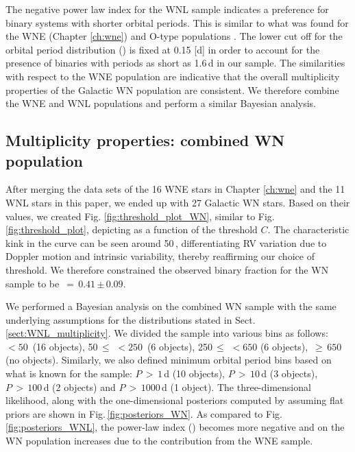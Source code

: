 The negative power law index for the WNL sample indicates a preference for binary systems with shorter orbital periods. This is similar to what was found for the WNE (Chapter \ref{ch:wne}) and O-type populations \citep{sana_binary_2012}. The lower cut off for the orbital period distribution (\logPminWNL{}) is fixed at 0.15 [d] in order to account for the presence of binaries with periods as short as 1.6\,d in our sample. The similarities with respect to the WNE population are indicative that the overall multiplicity properties of the Galactic WN population are consistent. We therefore combine the WNE and WNL populations and perform a similar Bayesian analysis.


\subsection{Multiplicity properties: combined WN population}  \label{sect:WN_multiplicity}
After merging the data sets of the 16 WNE stars in Chapter \ref{ch:wne} and the 11 WNL stars in this paper, we ended up with 27 Galactic WN stars. Based on their \DelRV{} values, we created Fig. \ref{fig:threshold_plot_WN}, similar to Fig. \ref{fig:threshold_plot}, depicting \fobsWN{} as a function of the threshold $C$. The characteristic kink in the curve can be seen around 50\,\kms{}, differentiating RV variation due to Doppler motion and intrinsic variability, thereby reaffirming our choice of threshold. We therefore constrained the observed binary fraction for the WN sample to be \fobsWN{}\,$=\,0.41$\,$\pm$\,$0.09$.

We performed a Bayesian analysis on the combined WN sample with the same underlying assumptions for the distributions stated in Sect. \ref{sect:WNL_multiplicity}. We divided the sample into various \DelRV{} bins as follows: \DelRV{}\,$< 50\,$\kms{} (16 objects), 50\,$\le$\,\DelRV{}\,$<250\,$\kms{} (6 objects), 250\,$\le$\,\DelRV{}\,$<650$ (6 objects), \DelRV{}\,$\ge\,650$\,\kms{} (no objects). Similarly, we also defined minimum orbital period bins based on what is known for the sample: $P\,>\,1\,$d (10 objects), $P\,>\,10\,$d (3 objects), $P\,>\,100\,$d (2 objects) and $P\,>\,1000\,$d (1 object). The three-dimensional likelihood, along with the one-dimensional posteriors computed by assuming flat priors are shown in Fig.\,\ref{fig:posteriors_WN}. As compared to Fig.\,\ref{fig:posteriors_WNL}, the power-law index (\piWN{}) becomes more negative and \fintWN{} on the WN population increases due to the contribution from the WNE sample.


